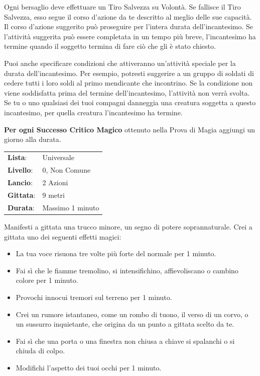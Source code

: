 \begin{multicols}{2}
Ogni bersaglio deve effettuare un Tiro Salvezza su Volontà. Se fallisce il Tiro Salvezza, esso segue il corso d'azione da te descritto al meglio delle sue capacità. Il corso d'azione suggerito può proseguire per l'intera durata dell'incantesimo. Se l'attività suggerita può essere completata in un tempo più breve, l'incantesimo ha termine quando il soggetto termina di fare ciò che gli è stato chiesto.

Puoi anche specificare condizioni che attiveranno un'attività speciale per la durata dell'incantesimo. Per esempio, potresti suggerire a un gruppo di soldati di cedere tutti i loro soldi al primo mendicante che incontrino. Se la condizione non viene soddisfatta prima del termine dell'incantesimo, l'attività non verrà svolta. Se tu o uno qualsiasi dei tuoi compagni danneggia una creatura soggetta a questo incantesimo, per quella creatura l'incantesimo ha termine.

\textbf{Per ogni Successo Critico Magico} ottenuto nella Prova di Magia aggiungi un giorno alla durata.

\noindent\begin{tabularx}{\linewidth}{p{1.3cm}X}
	\rowcolor{gray!20}\textbf{Lista}: & Universale \\
	\textbf{Livello}: & 0, Non Comune \\
	\rowcolor{gray!20}\textbf{Lancio}: & 2 Azioni \\
	\textbf{Gittata}: & 9 metri \\
	\rowcolor{gray!20}\textbf{Durata}: & Massimo 1 minuto \\
\end{tabularx}\smallskip

Manifesti a gittata una trucco minore, un segno di potere soprannaturale. Crei a gittata uno dei seguenti effetti magici:

\begin{itemize}[leftmargin=*] \setlength{\itemsep}{0pt}
	\item La tua voce risuona tre volte più forte del normale per 1 minuto.
	\item Fai sì che le fiamme tremolino, si intensifichino, affievoliscano o cambino colore per 1 minuto.
	\item Provochi innocui tremori sul terreno per 1 minuto.
	\item Crei un rumore istantaneo, come un rombo di tuono, il verso di un corvo, o un sussurro inquietante, che origina da un punto a gittata scelto da te.
	\item Fai sì che una porta o una finestra non chiusa a chiave si spalanchi o si chiuda di colpo.
	\item Modifichi l'aspetto dei tuoi occhi per 1 minuto.
\end{itemize}


\end{multicols}
